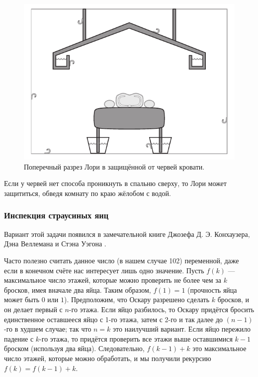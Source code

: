 \begin{figure}[h!]
\centering
\includegraphics[scale=0.5]{pics/chervi}
\caption{Поперечный разрез Лори в защищённой от червей кровати.}
\label{pic:chervi}
\end{figure}

Если у червей нет способа проникнуть в спальню сверху, то Лори может защититься, обведя комнату по краю жёлобом с водой.

\subsubsection*{Инспекция страусиных яиц}

Вариант этой задачи появился в замечательной книге Джозефа Д. Э. Конхаузера, Дэна Веллемана и Стэна Уэгона \cite{konhauser-velleman-wagon}.

Часто полезно считать данное число (в нашем случае 102) переменной, даже если в конечном счёте нас интересует лишь одно значение.
Пусть $f(k)$ --- максимальное число этажей, которые можно проверить не более чем за $k$ бросков, имея вначале два яйца.
Таким образом, $f(1) = 1$ (прочность яйца может быть $0$ или $1$).
Предположим, что Оскару разрешено сделать $k$ бросков, и он делает первый с $n$-го этажа.
Если яйцо разбилось, то Оскару придётся бросить единственное оставшееся яйцо с 1-го этажа, затем с 2-го и так далее до $(n-1)$-го в худшем случае;
так что $n = k$ это наилучший вариант.
Если яйцо пережило падение с $k$-го этажа, то придётся проверить все этажи выше оставшимися $k-1$ броском (используя два яйца).
Следовательно, $f(k - 1) + k$ это максимальное число этажей, которые можно обработать,
и мы получили рекурсию $f(k) = f(k - 1) + k$.

